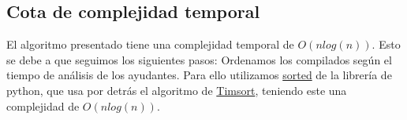 \subsection{Cota de complejidad temporal}

El algoritmo presentado tiene una complejidad temporal de $O(n log(n))$. Esto se debe a 
que seguimos los siguientes pasos:
Ordenamos los compilados según el tiempo de análisis de los ayudantes. Para ello utilizamos
\href{https://docs.python.org/3/howto/sorting.html}{sorted} de la librería de python, que usa 
por detrás el algoritmo de
\href{https://en.wikipedia.org/wiki/Timsort}{Timsort}, teniendo este una complejidad de $O(n log(n))$.
